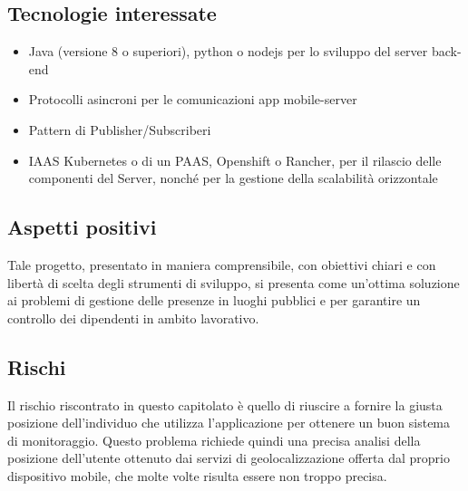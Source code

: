 \documentclass[../studio-di-fattibilita.tex]{subfiles}
\begin{document}
\subsection{Tecnologie interessate}%
\label{tecnologie_interessate}
\begin{itemize}
  \item Java (versione 8 o superiori), python o nodejs per lo sviluppo del server back-end
  \item Protocolli asincroni per le comunicazioni app mobile-server
  \item Pattern di Publisher/Subscriberi
  \item IAAS Kubernetes o di un PAAS, Openshift o Rancher, per il rilascio delle componenti del Server, nonché per la gestione della scalabilità orizzontale
\end{itemize}

\subsection{Aspetti positivi}%
\label{aspetti_positivi}
Tale progetto, presentato in maniera comprensibile, con obiettivi chiari e con libertà di scelta degli strumenti di sviluppo, si presenta come un'ottima soluzione ai problemi di gestione delle presenze in luoghi pubblici  e per garantire un controllo dei dipendenti in ambito lavorativo.

\subsection{Rischi}%
\label{rischi}
Il rischio riscontrato in questo capitolato è quello di riuscire a fornire la giusta posizione dell'individuo che utilizza l'applicazione per ottenere un buon sistema di monitoraggio. Questo problema richiede quindi una precisa analisi della posizione dell'utente ottenuto dai servizi di geolocalizzazione offerta dal proprio dispositivo mobile, che molte volte risulta essere non troppo precisa.
\end{document}
